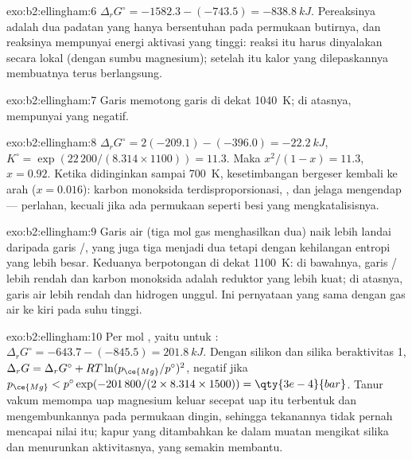 \begin{solution}{exo:b2:ellingham:6}
$\Delta_r G^\circ = -1582.3 - (-743.5) = \qty{-838.8}{kJ}$. Pereaksinya
adalah dua padatan yang hanya bersentuhan pada permukaan butirnya, dan
reaksinya mempunyai energi aktivasi yang tinggi: reaksi itu harus dinyalakan
secara lokal (dengan sumbu magnesium); setelah itu kalor yang
dilepaskannya membuatnya terus berlangsung.
\end{solution}

\begin{solution}{exo:b2:ellingham:7}
Garis  memotong garis  di dekat
\qty{1040}{K}; di atasnya,  mempunyai  yang negatif.
\end{solution}

\begin{solution}{exo:b2:ellingham:8}
$\Delta_r G^\circ = 2(-209.1) - (-396.0) = \qty{-22.2}{kJ}$, $K^\circ =
\exp(22\,200/(8.314 \times 1100)) = 11.3$. Maka $x^2/(1 - x) = 11.3$,
$x =
0.92$. Ketika didinginkan sampai \qty{700}{K}, kesetimbangan bergeser
kembali ke arah  ($x = 0.016$): karbon monoksida terdisproporsionasi,
, dan jelaga mengendap --- perlahan, kecuali jika ada
permukaan seperti besi yang mengkatalisisnya.
\end{solution}

\begin{solution}{exo:b2:ellingham:9}
Garis air (tiga mol gas menghasilkan dua) naik lebih landai daripada garis
/, yang juga tiga menjadi dua tetapi dengan kehilangan
entropi yang lebih besar. Keduanya berpotongan di dekat \qty{1100}{K}: di
bawahnya, garis / lebih rendah dan karbon monoksida adalah
reduktor yang lebih kuat; di atasnya, garis air lebih rendah dan hidrogen
unggul. Ini pernyataan yang sama dengan  gas air
 ke kiri pada suhu tinggi.
\end{solution}

\begin{solution}{exo:b2:ellingham:10}
Per mol , yaitu untuk : $\Delta_r
G^\circ = -643.7 - (-845.5) = \qty{+201.8}{kJ}$. Dengan silikon dan silika
beraktivitas 1, $\Delta_r G = \Delta_r G^\circ + RT\ln(p_{\ce{Mg}}/p^\circ)^2$,
negatif jika $p_{\ce{Mg}} < p^\circ\exp(-201\,800/(2 \times 8.314 \times 1500)) =
\qty{3e-4}{bar}$. Tanur vakum memompa uap magnesium keluar secepat uap itu
terbentuk dan mengembunkannya pada permukaan dingin, sehingga tekanannya
tidak pernah mencapai nilai itu; kapur yang ditambahkan ke dalam muatan
mengikat silika dan menurunkan aktivitasnya, yang semakin membantu.
\end{solution}

